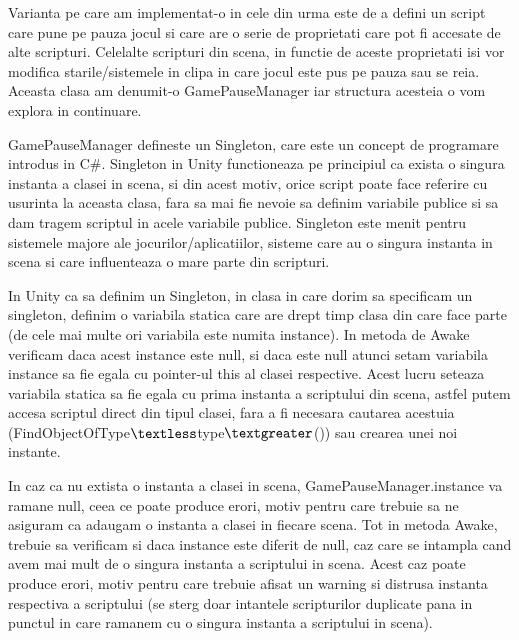 \documentclass[12pt, a4paper]{article}
\begin{document}
	Varianta pe care am implementat-o in cele din urma este de a defini un script care pune pe pauza jocul si care are o serie de proprietati care pot fi accesate de alte scripturi. Celelalte scripturi din scena, in functie de aceste proprietati isi vor modifica starile/sistemele in clipa in care jocul este pus pe pauza sau se reia. Aceasta clasa am denumit-o GamePauseManager iar structura acesteia o vom explora in continuare.
	\newline
	
	GamePauseManager defineste un Singleton, care este un concept de programare introdus in C\#. Singleton in Unity functioneaza pe principiul ca exista o singura instanta a clasei in scena, si din acest motiv, orice script poate face referire cu usurinta la aceasta clasa, fara sa mai fie nevoie sa definim variabile publice si sa dam tragem scriptul in acele variabile publice. Singleton este menit pentru sistemele majore ale jocurilor/aplicatiilor, sisteme care au o singura instanta in scena si care influenteaza o mare parte din scripturi. 
	\newline
	
	In Unity ca sa definim un Singleton, in clasa in care dorim sa specificam un singleton, definim o variabila statica care are drept timp clasa din care face parte (de cele mai multe ori variabila este numita instance). In metoda de Awake verificam daca acest instance este null, si daca este null atunci setam variabila instance sa fie egala cu pointer-ul this al clasei respective. Acest lucru seteaza variabila statica sa fie egala cu prima instanta a scriptului din scena, astfel putem accesa scriptul direct din tipul clasei, fara a fi necesara cautarea acestuia (FindObjectOfType$\textless$type$\textgreater$()) sau crearea unei noi instante. 
	\newline
	
	In caz ca nu extista o instanta a clasei in scena, GamePauseManager.instance va ramane null, ceea ce poate produce erori, motiv pentru care trebuie sa ne asiguram ca adaugam o instanta a clasei in fiecare scena. Tot in metoda Awake, trebuie sa verificam si daca instance este diferit de null, caz care se intampla cand avem mai mult de o singura instanta a scriptului in scena. Acest caz poate produce erori, motiv pentru care trebuie afisat un warning si distrusa instanta respectiva a scriptului (se sterg doar intantele scripturilor duplicate pana in punctul in care ramanem cu o singura instanta a scriptului in scena).
	\newline
	
\end{document}
